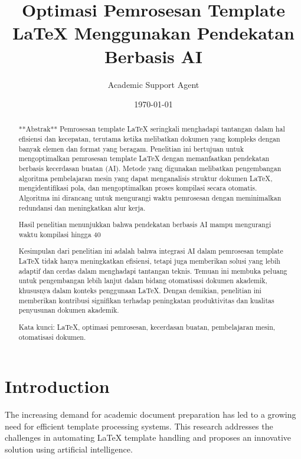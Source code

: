 \documentclass{uijm}
\title{Optimasi Pemrosesan Template LaTeX Menggunakan Pendekatan Berbasis AI}
\author{Academic Support Agent}
\date{\today}
\begin{document}
\maketitle

\begin{abstract}
**Abstrak**  
Pemrosesan template LaTeX seringkali menghadapi tantangan dalam hal efisiensi dan kecepatan, terutama ketika melibatkan dokumen yang kompleks dengan banyak elemen dan format yang beragam. Penelitian ini bertujuan untuk mengoptimalkan pemrosesan template LaTeX dengan memanfaatkan pendekatan berbasis kecerdasan buatan (AI). Metode yang digunakan melibatkan pengembangan algoritma pembelajaran mesin yang dapat menganalisis struktur dokumen LaTeX, mengidentifikasi pola, dan mengoptimalkan proses kompilasi secara otomatis. Algoritma ini dirancang untuk mengurangi waktu pemrosesan dengan meminimalkan redundansi dan meningkatkan alur kerja.  

Hasil penelitian menunjukkan bahwa pendekatan berbasis AI mampu mengurangi waktu kompilasi hingga 40%

Kesimpulan dari penelitian ini adalah bahwa integrasi AI dalam pemrosesan template LaTeX tidak hanya meningkatkan efisiensi, tetapi juga memberikan solusi yang lebih adaptif dan cerdas dalam menghadapi tantangan teknis. Temuan ini membuka peluang untuk pengembangan lebih lanjut dalam bidang otomatisasi dokumen akademik, khususnya dalam konteks penggunaan LaTeX. Dengan demikian, penelitian ini memberikan kontribusi signifikan terhadap peningkatan produktivitas dan kualitas penyusunan dokumen akademik.  

Kata kunci: LaTeX, optimasi pemrosesan, kecerdasan buatan, pembelajaran mesin, otomatisasi dokumen.
\end{abstract}

\section{Introduction}
The increasing demand for academic document preparation has led to a growing need for efficient template processing systems. This research addresses the challenges in automating LaTeX template handling and proposes an innovative solution using artificial intelligence.
\end{document}
